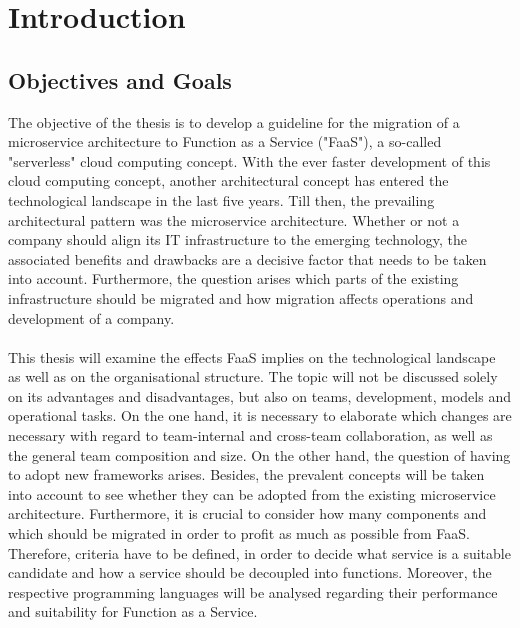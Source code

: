 \documentclass[a4paper,11pt, pagesize]{scrartcl}
\begin{document}
\begin{spacing}{1.2}
\begin{spacing}{1.07}
\begin{tabular}{ p{2cm} p{10cm}}
\end{tabular}
\end{spacing}
\newpage
\begin{spacing}{1.2}
\tableofcontents
\end{spacing}
\newpage
\newpage
\section{Introduction}
\label{Introduction}

\subsection{Objectives and Goals}
\label{Objectives and Goals}
The objective of the thesis is to develop a guideline for the migration of a microservice architecture to Function as a Service ("FaaS"), a so-called "serverless" cloud computing concept. With the ever faster development of this cloud computing concept, another architectural concept has entered the technological landscape in the last five years. Till then, the prevailing architectural pattern was the microservice architecture. Whether or not a company should align its IT infrastructure to the emerging technology, the associated benefits and drawbacks are a decisive factor that needs to be taken into account. Furthermore, the question arises which parts of the existing infrastructure should be migrated and how migration affects operations and development of a company.\\\\
This thesis will examine the effects FaaS implies on the technological landscape as well as on the organisational structure. The topic will not be discussed solely on its advantages and disadvantages, but also on teams, development, models and operational tasks. On the one hand, it is necessary to elaborate which changes are necessary with regard to team-internal and cross-team collaboration, as well as the general team composition and size. On the other hand, the question of having to adopt new frameworks arises. Besides, the prevalent concepts will be taken into account to see whether they can be adopted from the existing microservice architecture. Furthermore, it is crucial to consider how many components and which should be migrated in order to profit as much as possible from FaaS. Therefore, criteria have to be defined, in order to decide what service is a suitable candidate and how a service should be decoupled into functions. Moreover, the respective programming languages will be analysed regarding their performance and suitability for Function as a Service. \\\\

\end{spacing}
\end{document}
